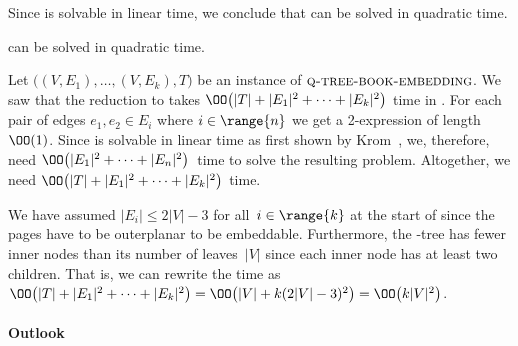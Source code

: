 

Since \probTwoSat is solvable in linear time, we conclude that \probQTree can be solved in quadratic time.

\begin{theorem}
\label{theorem:q-tree-book}
\probQTree can be solved in quadratic time.
\end{theorem}
\begin{myproof}
Let $\bigl((V, E_1),\dotsc, (V, E_k), T\bigr)$ be an instance of $\textsc{q-tree-book-embedding}$.
We saw that the reduction to \probTwoSat takes $\OO\bigl(|T| + |E_1|^2 + \dotsb + |E_k|^2\bigr)$ time
in . For each pair of edges $e_1, e_2 \in E_i$ where $i \in \range{n}$ we get a 2-\CNF expression of length $\OO(1)$. Since \probTwoSat is solvable in linear
time as first shown by Krom~\cite{Krom67}, we, therefore, need $\OO\bigl(|E_1|^2 + \dotsb + |E_n|^2\bigr)$~time to solve the resulting \probTwoSat problem.
Altogether, we need $\OO\bigl(|T| + |E_1|^2 + \dotsb + |E_k|^2\bigr)$ time.
\end{myproof}

We have assumed $|E_i| \le 2|V|-3$ for all~$i \in \range{k}$ at the
start of  since the pages
have to be outerplanar to be embeddable. Furthermore, the \Q-tree 
has fewer inner nodes than its number of leaves~$|V|$ since each inner node
has at least two children.
That is, we can rewrite the time as
$\OO\bigl(|T| + |E_1|^2 + \dotsb + |E_k|^2\bigr) = \OO\bigl(|V| + k(2|V|-3)^2\bigr) = \OO\bigl(k|V|^2\bigr)$.

\paragraph{Outlook}

